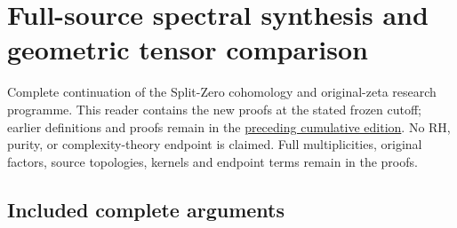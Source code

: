 \chapter{Full-source spectral synthesis and geometric tensor
comparison}\label{full-source-spectral-synthesis-and-geometric-tensor-comparison}

Complete continuation of the Split-Zero cohomology and original-zeta
research programme. This reader contains the new proofs at the stated
frozen cutoff; earlier definitions and proofs remain in the
\href{https://github.com/KokunoYumeto/zeta-function-research-reader/blob/36a82ecca98addb8a98b48204e349737856c7223/workbenches/splitzero-tandem/continuations/20260924-cohomology-weight-and-character-lifts/README.md}{preceding
cumulative edition}. No RH, purity, or complexity-theory endpoint is
claimed. Full multiplicities, original factors, source topologies,
kernels and endpoint terms remain in the proofs.

\section{Included complete arguments}\label{included-complete-arguments}

